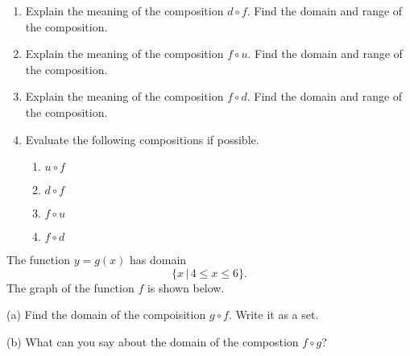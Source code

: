 \documentclass{ximera}
\begin{document}
\begin{exploration}
\begin{enumerate}
\item Explain the meaning of the composition $d\circ f$. Find the domain and range of the composition.

\item Explain the meaning of the composition $f\circ u$. Find the domain and range of the composition.

\item Explain the meaning of the composition $f\circ d$. Find the domain and range of the composition.

\item Evaluate the following compositions if possible.


\begin{enumerate}
\item $u\circ f$

\item $d\circ f$

\item $f\circ u$

\item $f\circ d$

\end{enumerate}

\end{enumerate}

\end{exploration}




\begin{example} \label{Ex7:Quadratics}
The function $y=g(x)$ has domain
\[
   \{  x \, | \, 4 \leq x \leq 6   \}.
\]
The graph of the function $f$ is shown below.

(a) Find the domain of the compoisition $g\circ f$. Write it as a set.

(b) What can you say about the domain of the compostion $f\circ g$?


 
\begin{onlineOnly}
    \begin{center}
\end{center}
\end{onlineOnly}


\end{example}
\end{document}
